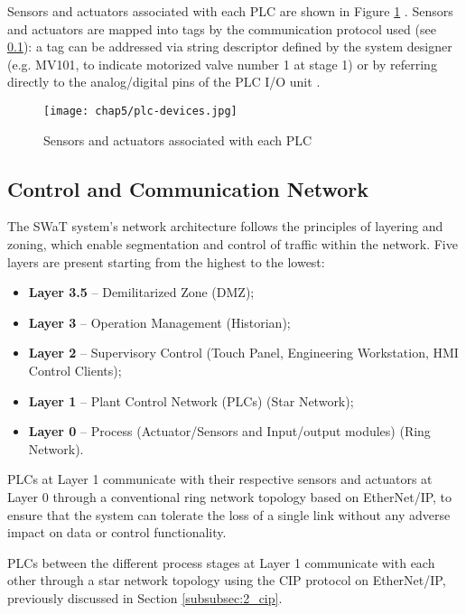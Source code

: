 Sensors and actuators associated with each PLC are shown in Figure \ref{fig:5_swat_sensors_plc} \cite{swat_tecnical_pdf}.
Sensors and actuators are mapped into tags by the communication protocol used (see \ref{subsec:5_swat_network_architecture}): a tag can be addressed via string descriptor defined by the system designer (e.g. MV101, to indicate motorized valve number 1 at stage 1) or by referring directly to the analog/digital pins of the PLC I/O unit \cite{swat_tippenhauer}.

\begin{figure}[ht]
	\centering
	\texttt{[image: chap5/plc-devices.jpg]}
	\caption{Sensors and actuators associated with each PLC}
	\label{fig:5_swat_sensors_plc}
\end{figure}

\subsection{Control and Communication Network}
\label{subsec:5_swat_network_architecture}
The SWaT system's network architecture follows the principles of layering and zoning, which enable segmentation and control of traffic within the network.
\newline \newline
Five layers are present starting from the highest to the lowest: 

\begin{itemize}
	\item \textbf{Layer 3.5} -- Demilitarized Zone (DMZ);
	\item \textbf{Layer 3} -- Operation Management (Historian);
	\item \textbf{Layer 2} -- Supervisory Control (Touch Panel, Engineering Workstation, HMI Control Clients);
	\item \textbf{Layer 1} -- Plant Control Network (PLCs) (Star Network);
	\item \textbf{Layer 0} -- Process (Actuator/Sensors and Input/output modules) (Ring Network).
\end{itemize}

PLCs at Layer 1 communicate with their respective sensors and actuators at Layer 0 through a conventional ring network topology based on EtherNet/IP, to ensure that the system can tolerate the loss of a single link without any adverse impact on data or control functionality.

PLCs between the different process stages at Layer 1 communicate with each other through a star network topology using the CIP protocol on EtherNet/IP, previously discussed in Section \ref{subsubsec:2_cip}.

